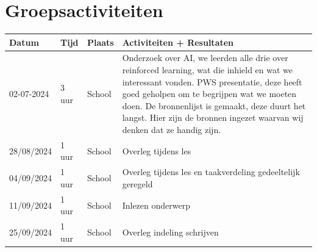 \documentclass[a4paper,10pt]{report}
\begin{document}
\section{Groepsactiviteiten}
\begin{longtable}{|p{}|p{}|p{}|p{}|}
    \hline
    \textbf{Datum} & \textbf{Tijd} & \textbf{Plaats} & \textbf{Activiteiten + Resultaten}                                                                                                                                                                                                                                                                                   \\
    \hline
    02-07-2024     & 3 uur         & School          & Onderzoek over AI, we leerden alle drie over reinforced learning, wat die inhield en wat we interessant vonden. PWS presentatie, deze heeft goed geholpen om te begrijpen wat we moeten doen. De bronnenlijst is gemaakt, deze duurt het langst. Hier zijn de bronnen ingezet waarvan wij denken dat ze handig zijn. \\
    \hline
    28/08/2024     & 1 uur         & School          & Overleg tijdens les                                                                                                                                                                                                                                                                                                  \\
    \hline
    04/09/2024     & 1 uur         & School          & Overleg tijdens les en taakverdeling gedeeltelijk geregeld                                                                                                                                                                                                                                                           \\
    \hline
    11/09/2024     & 1 uur         & School          & Inlezen onderwerp                                                                                                                                                                                                                                                                                                    \\
    \hline
    25/09/2024     & 1 uur         & School          & Overleg indeling schrijven                                                                                                                                                                                                                                                                                           \\

\end{longtable}
\end{document}
